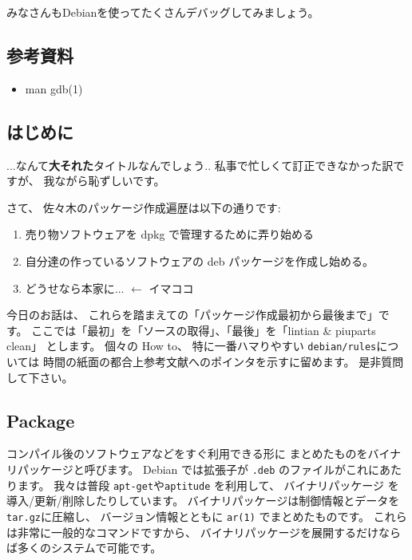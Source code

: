\documentclass[mingoth,a4paper]{jsarticle}
\begin{document}
みなさんもDebianを使ってたくさんデバッグしてみましょう。

\subsection{参考資料}
\begin{itemize}
 \item man gdb(1)
\end{itemize}


\subsection{はじめに}

...なんて{\bf 大それた}タイトルなんでしょう..%
私事で忙しくて訂正できなかった訳ですが、 我ながら恥ずしいです。

さて、 佐々木のパッケージ作成遍歴は以下の通りです:
\begin{enumerate}
      \item 売り物ソフトウェアを dpkg で管理するために弄り始める
      \item 自分達の作っているソフトウェアの deb パッケージを作成し始める。
      \item どうせなら本家に... $\leftarrow$ イマココ
\end{enumerate}
今日のお話は、 これらを踏まえての「パッケージ作成最初から最後まで」です。
ここでは「最初」を「ソースの取得」、「最後」を「lintian \& piuparts clean」
とします。 
個々の How to、 特に一番ハマりやすい {\tt debian/rules}については
時間の紙面の都合上参考文献へのポインタを示すに留めます。 是非質問して下さい。

\subsection{Package}

コンパイル後のソフトウェアなどをすぐ利用できる形に
まとめたものをバイナリパッケージと呼びます。 
%
Debian では拡張子が {\tt .deb} のファイルがこれにあたります。
%
我々は普段 {\tt apt-get}や{\tt aptitude} を利用して、 バイナリパッケージ
を導入/更新/削除したりしています。
%
バイナリパッケージは制御情報とデータを {\tt tar.gz}に圧縮し、 
バージョン情報とともに {\tt ar(1)} でまとめたものです。
%
これらは非常に一般的なコマンドですから、
バイナリパッケージを展開するだけならば多くのシステムで可能です。
\end{document}
